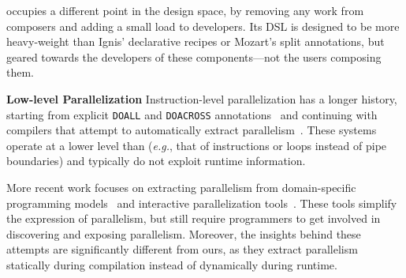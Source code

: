 \documentclass[sigplan,10pt,review,anonymous]{acmart}
\newcommand{\eg}{{\em e.g.}, }
\newcommand{\heading}[1]{\vspace{4pt}\noindent\textbf{#1}\enspace}
\newcommand{\ttt}[1]{\texttt{\small #1}}
\begin{document}
\sys occupies a different point in the design space, by removing any work from composers and adding a small load to developers.
Its DSL is designed to be more heavy-weight than Ignis' declarative recipes or Mozart's split annotations, but geared towards the developers of these components---not the users composing them.



\heading{Low-level Parallelization}
Instruction-level parallelization has a longer history, starting from explicit \ttt{DOALL} and \ttt{DOACROSS} annotations~\cite{par1, par2} and continuing with compilers that attempt to automatically extract parallelism~\cite{padua1993polaris,hall1996maximizing}.
These systems operate at a lower level than \sys (\eg that of instructions or loops instead of pipe boundaries) and typically do not exploit runtime information.

More recent work focuses on extracting parallelism from domain-specific programming models~\cite{cilk5, streamIt, galois} and interactive parallelization tools~\cite{parascope, ipat}.
These tools simplify the expression of parallelism, but still require programmers to get involved in discovering and exposing parallelism.
Moreover, the insights behind these attempts are significantly different from ours, as they extract parallelism statically during compilation instead of dynamically during runtime.


\end{document}

